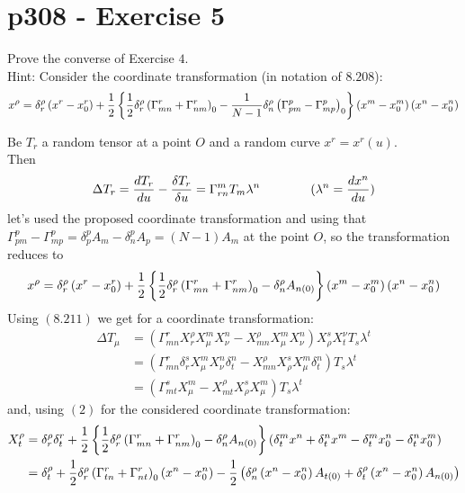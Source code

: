 \section{p308 - Exercise 5}
\begin{tcolorbox}
Prove the converse of Exercise $4$.\\
Hint: Consider the coordinate transformation (in notation of $\mathbf{8.208}$):
$$x^{\rho} = \delta^{\rho}_r\left(x^r-x^r_0\right) + \frac{1}{2}\left\{\frac{1}{2}\delta^{\rho}_r\left(\Gamma^r_{mn} +\Gamma^r_{nm}\right)_0 - \frac{1}{N-1}\delta^{\rho}_n\left(\Gamma^p_{pm}-\Gamma^p_{mp}\right)_0 \right\}\left(x^m-x^m_0\right)\left(x^n-x^n_0\right)$$
\end{tcolorbox}
Be $T_r$ a random tensor at a point $O$ and a random curve $x^r=x^r(u)$.\\ Then 
\begin{align}\Delta T_r=  \dv{T_r}{u}-\fdv{T_r}{u}  =  \Gamma^m_{rn}T_m\lambda^n
\spatie (\lambda^n=\dv{x^n}{u})\end{align} 
let's used the proposed coordinate transformation and using that $\Gamma^p_{pm}-\Gamma^p_{mp} = \delta^p_pA_m - \delta^p_n A_p= \left(N-1\right)A_m$  at the point $O$, so the transformation reduces to
\begin{align}
x^{\rho} = \delta^{\rho}_r\left(x^r-x^r_0\right) + \frac{1}{2}\left\{\frac{1}{2}\delta^{\rho}_r\left(\Gamma^r_{mn} +\Gamma^r_{nm}\right)_0 - \delta^{\rho}_nA_{n(0)} \right\}\left(x^m-x^m_0\right)\left(x^n-x^n_0\right)
\end{align} 
Using $\mathbf{(8.211)}$ we get for a coordinate transformation:
\begin{align}
\Delta T_{\mu} &= \left( \Gamma^r_{mn}X_r^{\rho}X^m_{\mu}X^n_{\nu}- X_{mn}^{\rho}X^m_{\mu}X^n_{\nu} \right)X^s_{\rho}X^{\nu}_tT_s\lambda^t\\
&= \left( \Gamma^r_{mn}\delta_r^{s}X^m_{\mu}X^n_{\nu}\delta_t^{n}- X_{mn}^{\rho}X^s_{\rho}X^m_{\mu}\delta^n_{t} \right)T_s\lambda^t\\
&= \left( \Gamma^s_{mt}X^m_{\mu}- X_{mt}^{\rho}X^s_{\rho}X^m_{\mu} \right)T_s\lambda^t
\end{align}
and, using $(2)$  for the considered coordinate transformation:
\begin{align}
X^{\rho}_t &= \delta^{\rho}_r\delta^{r}_t + \frac{1}{2}\left\{\frac{1}{2}\delta^{\rho}_r\left(\Gamma^r_{mn} +\Gamma^r_{nm}\right)_0 - \delta^{\rho}_nA_{n(0)} \right\}\left(\delta^m_t x^n+\delta^n_t x^m-\delta^m_t x^n_0-\delta^n_t x^m_0\right)\\
&= \delta^{\rho}_t + \frac{1}{2}\delta^{\rho}_r\left(\Gamma^r_{tn} +\Gamma^r_{nt}\right)_0\left(x^n - x^n_0 \right) - \frac{1}{2}\left(\delta^{\rho}_n\left(x^n-x^n_0\right)A_{t(0)}+\delta^{\rho}_t\left(x^n-x^n_0\right)A_{n(0)} \right)
\end{align}
